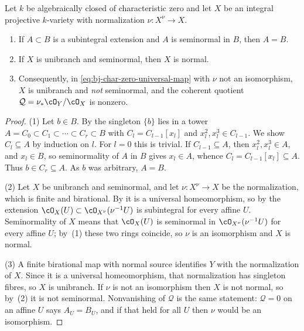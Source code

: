 \begin{proposition}
\label{prop:ch44-seminormal-unibranch-normal}
Let $k$ be algebraically closed of characteristic zero and let $X$ be an
integral projective $k$-variety with normalization $\nu:X^\nu\to X$.
\begin{enumerate}
\item If $A\subset B$ is a subintegral extension and $A$ is seminormal
      in $B$, then $A=B$.
\item If $X$ is unibranch and seminormal, then $X$ is normal.
\item Consequently, in \eqref{eq:bj-char-zero-universal-map} with
      $\nu$ not an isomorphism, $X$ is unibranch and \emph{not}
      seminormal, and the coherent quotient
      $\mathcal Q=\nu_*\cO_Y/\cO_X$ is nonzero.
\end{enumerate}
\end{proposition}

\begin{proof}
(1)  Let $b\in B$.  By  the singleton
$\{b\}$ lies in a tower
$A=C_0\subset C_1\subset\cdots\subset C_r\subset B$ with
$C_l=C_{l-1}[x_l]$ and $x_l^2,x_l^3\in C_{l-1}$.  We show
$C_l\subseteq A$ by induction on $l$.  For $l=0$ this is trivial.  If
$C_{l-1}\subseteq A$, then $x_l^2,x_l^3\in A$, and $x_l\in B$, so
seminormality of $A$ in $B$ gives $x_l\in A$, whence
$C_l=C_{l-1}[x_l]\subseteq A$.  Thus $b\in C_r\subseteq A$.  As $b$
was arbitrary, $A=B$.

(2)  Let $X$ be unibranch and seminormal, and let $\nu:X^\nu\to X$ be
the normalization, which is finite and birational.  By
 it is a universal
homeomorphism, so by  the extension
$\cO_X(U)\subset\cO_{X^\nu}(\nu^{-1}U)$ is subintegral for every affine
$U$.  Seminormality of $X$ means that $\cO_X(U)$ is seminormal in
$\cO_{X^\nu}(\nu^{-1}U)$ for every affine $U$; by~(1) these two rings
coincide, so $\nu$ is an isomorphism and $X$ is normal.

(3)  A finite birational map with normal source identifies $Y$ with
the normalization of $X$.  Since it is a universal homeomorphism, that
normalization has singleton fibres, so $X$ is unibranch.
If $\nu$ is not an isomorphism then $X$ is not normal, so by~(2)
it is not seminormal.  Nonvanishing of $\mathcal Q$ is the same statement:
$\mathcal Q=0$ on an affine $U$ says $A_U=B_U$, and if that held for
all $U$ then $\nu$ would be an isomorphism.
\end{proof}

